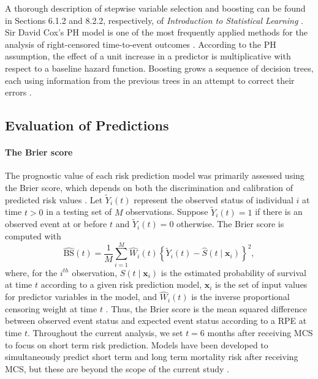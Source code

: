 \documentclass{article}
\begin{document}
A thorough description of stepwise variable selection and boosting can
be found in Sections 6.1.2 and 8.2.2, respectively, of
\emph{Introduction to Statistical Learning}
\cite{james2013introduction}. Sir David Cox's PH model is one of the
most frequently applied methods for the analysis of right-censored
time-to-event outcomes \cite{kleinbaum2010survival}. According to the PH
assumption, the effect of a unit increase in a predictor is
multiplicative with respect to a baseline hazard function. Boosting
grows a sequence of decision trees, each using information from the
previous trees in an attempt to correct their errors
\cite{friedman2001greedy, chen2016xgboost}.

\hypertarget{evaluation-of-predictions}{%
\subsection{Evaluation of Predictions}\label{evaluation-of-predictions}}

\label{subsec:evaluation}

\paragraph{The Brier score}

The prognostic value of each risk prediction model was primarily
assessed using the Brier score, which depends on both the discrimination
and calibration of predicted risk values
\cite{graf1999assessment, rufibach2010use}. Let \(\tilde{Y}_i(t)\)
represent the observed status of individual \(i\) at time \(t > 0\) in a
testing set of \(M\) observations. Suppose \(\tilde{Y}_i(t)=1\) if there
is an observed event at or before \(t\) and \(\tilde{Y}_i(t)=0\)
otherwise. The Brier score is computed with
\begin{equation} \label{eqn:brier_score}
\widehat{\textrm{BS}}(t)= \frac{1}{M} \sum_{i=1}^{M} \widehat{W}_i(t) \left\{ \tilde{Y}_i(t) - \widehat{S}(t \mid \bm{x}_i) \right\}^2, \end{equation}
where, for the \(i^{th}\) observation, \(\widehat{S}(t \mid \bm{x}_i)\)
is the estimated probability of survival at time \(t\) according to a
given risk prediction model, \(\bm{x}_i\) is the set of input values for
predictor variables in the model, and \(\widehat{W}_i(t)\) is the
inverse proportional censoring weight at time \(t\)
\cite{gerds2006consistent}. Thus, the Brier score is the mean squared
difference between observed event status and expected event status
according to a RPE at time \(t\). Throughout the current analysis, we
set \(t = 6\) months after receiving MCS to focus on short term risk
prediction. Models have been developed to simultaneously predict short
term and long term mortality risk after receiving MCS, but these are
beyond the scope of the current study
\cite{blackstone1986decomposition}.
\end{document}
